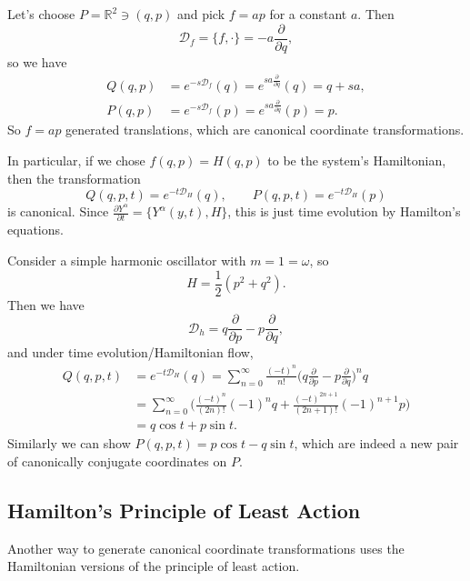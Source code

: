 \documentclass[12pt]{article}
\begin{document}
\begin{exbox}
	Let's choose $P = \mathbb{R}^2 \ni (q, p)$ and pick $f = ap$ for a constant $a$. Then
	\[
		\mathcal{D}_f = \{f, \cdot\} = - a \frac{\partial}{\partial q},
	\]
	so we have
	\begin{align*}
		Q(q, p) &= e^{-s \mathcal{D}_f}(q) = e^{s a \frac{\partial}{\partial q}}(q) = q + sa, \\
		P(q, p) &= e^{-s \mathcal{D}_f}(p) = e^{sa \frac{\partial}{\partial q}}(p) = p.
	\end{align*}
	So $f = ap$ generated translations, which are canonical coordinate transformations.
\end{exbox}

In particular, if we chose $f(q, p) = H(q, p)$ to be the system's Hamiltonian, then the transformation
\[
Q(q, p, t) = e^{-t \mathcal{D}_H}(q), \qquad P(q, p, t) = e^{-t \mathcal{D}_H}(p)
\]
is canonical. Since $\frac{\partial Y^\alpha}{\partial t} = \{Y^\alpha(y, t), H\}$, this is just time evolution by Hamilton's equations.

\begin{exbox}
	Consider a simple harmonic oscillator with $m = 1 = \omega$, so
	\[
	H = \frac{1}{2}(p^2 + q^2).
	\]
	Then we have
	\[
	\mathcal{D}_h = q \frac{\partial}{\partial p} - p \frac{\partial}{\partial q},
	\]
	and under time evolution/Hamiltonian flow,
	\begin{align*}
		Q(q, p, t) &= e^{-t \mathcal{D}_H}(q) = \sum_{n = 0}^{\infty} \frac{(-t)^n}{n!}\bigl(q \frac{\partial}{\partial p} - p \frac{\partial}{\partial q}\biggr)^{n} q \\
			   &= \sum_{n = 0}^{\infty} \biggl( \frac{(-t)^n}{(2n)!}(-1)^n q + \frac{(-t)^{2n+1}}{(2n+1)!}(-1)^{n+1}p \biggr) \\
			   &= q \cos t + p \sin t.
	\end{align*}
	Similarly we can show $P(q, p, t) = p \cos t - q \sin t$, which are indeed a new pair of canonically conjugate coordinates on $P$.
\end{exbox}

\subsection{Hamilton's Principle of Least Action}
\label{sub:ham_least_action}

Another way to generate canonical coordinate transformations uses the Hamiltonian versions of the principle of least action.
\end{document}
